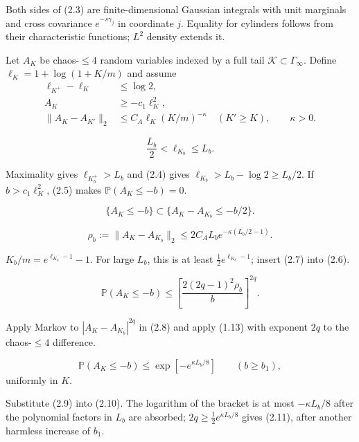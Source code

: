 \documentclass[11pt,a4paper]{article}
\newcommand{\PP}{\mathbb P}
\begin{document}
\Because Both sides of (2.3) are finite-dimensional Gaussian integrals with unit
marginals and cross covariance $e^{-s\gamma_j}$ in coordinate $j$.  Equality for
cylinders follows from their characteristic functions; $L^2$ density extends it.

\QedStep


Let $A_K$ be chaos-$\le4$ random variables indexed by a full tail
$\mathcal K\subset\Gamma_\infty$.  Define
$\ell_K=1+\log(1+K/m)$ and assume
\begin{align}
 \ell_{K^+}-\ell_K&\le\log2,\tag{2.4}\\
 A_K&\ge-c_1\ell_K^2,\tag{2.5}\\
 \|A_K-A_{K'}\|_2&\le C_A\ell_K(K/m)^{-\kappa}\quad(K'\ge K),
 \qquad \kappa>0.\tag{2.6}
\end{align}

\[
 \frac{L_b}{2}<\ell_{K_b}\le L_b.
\tag{2.7}
\]

\Because Maximality gives $\ell_{K_b^+}>L_b$ and (2.4) gives
$\ell_{K_b}>L_b-\log2\ge L_b/2$.  If $b>c_1\ell_K^2$, (2.5) makes
$\PP(A_K\le-b)=0$.

\[
 \{A_K\le-b\}\subset
 \{A_K-A_{K_b}\le-b/2\}.
\tag{2.8}
\]

\[
 \rho_b:=\|A_K-A_{K_b}\|_2
 \le2C_AL_b e^{-\kappa(L_b/2-1)}.
\tag{2.9}
\]

\Because $K_b/m=e^{\ell_{K_b}-1}-1$.  For large $L_b$, this is at least
$\tfrac12e^{\ell_{K_b}-1}$; insert (2.7) into (2.6).

\[
 \PP(A_K\le-b)
 \le\left[\frac{2(2q-1)^2\rho_b}{b}\right]^{2q}.
\tag{2.10}
\]

\Because Apply Markov to $|A_K-A_{K_b}|^{2q}$ in (2.8) and apply
(1.13) with exponent $2q$ to the chaos-$\le4$ difference.

\[
 \PP(A_K\le-b)\le\exp[-e^{\kappa L_b/8}]
 \qquad(b\ge b_1),
\tag{2.11}
\]
uniformly in $K$.

\Because Substitute (2.9) into (2.10).  The logarithm of the bracket is
at most $-\kappa L_b/8$ after the polynomial factors in $L_b$ are absorbed;
$2q\ge\tfrac12e^{\kappa L_b/8}$ gives (2.11), after another harmless
increase of $b_1$.
\end{document}
